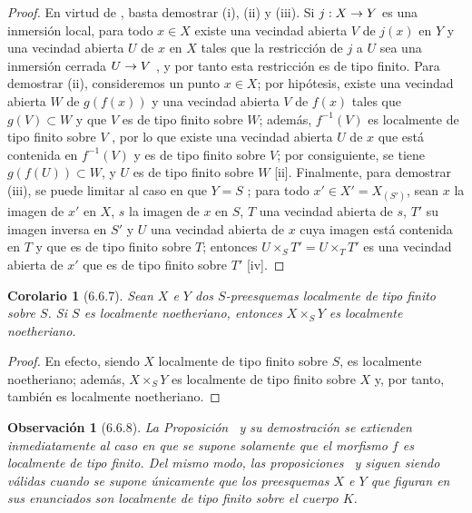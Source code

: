 \documentclass[oneside]{amsart}
\theoremstyle{ega-env-style}
\theoremstyle{ega-thm-env-style}
\newtheorem*{corollary}{Corolario}
\theoremstyle{ega-defn-env-style}
\newtheorem*{remark}{Observación}
\renewcommand{\to}{\mathchoice{\longrightarrow}{\rightarrow}{\rightarrow}{\rightarrow}}
\newcommand{\oldpage}[2][]{{\marginnote{\normalfont{\textbf{#1}~|~#2}}}\ignorespaces}
\let\EGAOriginalLabel\label
\renewcommand{\label}[1]{\phantomsection\EGAOriginalLabel{#1}}
\begin{document}
\begin{proof}
En virtud de , basta demostrar (i), (ii) y (iii).
Si $j:X\to Y$ es una inmersión local, para todo $x\in X$ existe una vecindad abierta $V$ de $j(x)$ en $Y$ y una vecindad abierta $U$ de $x$ en $X$ tales que la restricción de $j$ a $U$ sea una inmersión cerrada $U\to V$ , y por tanto esta restricción es de tipo finito.
Para demostrar (ii), consideremos un punto $x\in X$;
por hipótesis, existe una vecindad abierta $W$ de $g(f(x))$ y una vecindad abierta $V$ de $f(x)$ tales que $g(V)\subset W$ y que $V$ es de tipo finito sobre $W$;
además, $f^{-1}(V)$ es localmente de tipo finito sobre $V$ , por lo que existe una vecindad abierta $U$ de $x$ que
\oldpage[I]{155}
está contenida en $f^{-1}(V)$ y es de tipo finito sobre $V$;
por consiguiente, se tiene $g(f(U))\subset W$, y $U$ es de tipo finito sobre $W$ [ii].
Finalmente, para demostrar (iii), se puede limitar al caso en que $Y=S$ ;
para todo $x'\in X'=X_{(S')}$, sean $x$ la imagen de $x'$ en $X$, $s$ la imagen de $x$ en $S$, $T$ una vecindad abierta de $s$, $T'$ su imagen inversa en $S'$ y $U$ una vecindad abierta de $x$ cuya imagen está contenida en $T$ y que es de tipo finito sobre $T$;
entonces $U\times_S T'=U\times_T T'$ es una vecindad abierta de $x'$  que es de tipo finito sobre $T'$ [iv].
\end{proof}

\begin{corollary}[6.6.7]
\label{I.6.6.7}
Sean $X$ e $Y$ dos $S$-preesquemas localmente de tipo finito sobre $S$.
Si $S$ es localmente noetheriano, entonces $X\times_S Y$ es localmente noetheriano.
\end{corollary}

\begin{proof}
En efecto, siendo $X$ localmente de tipo finito sobre $S$, es localmente noetheriano; además, $X\times_S Y$ es localmente de tipo finito sobre $X$ y, por tanto, también es localmente noetheriano.
\end{proof}

\begin{remark}[6.6.8]
\label{I.6.6.8}
La Proposición~ y su demostración se extienden inmediatamente al caso en que se supone solamente que el morfismo $f$ es localmente de tipo finito.
Del mismo modo, las proposiciones~ y  siguen siendo válidas cuando se supone únicamente que los preesquemas $X$ e $Y$ que figuran en sus enunciados son localmente de tipo finito sobre el cuerpo $K$.
\end{remark}
\end{document}
